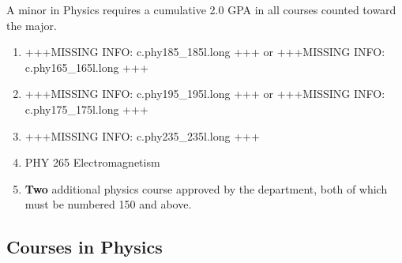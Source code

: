 \documentclass[
  letterpaper,
]{scrbook}
\begin{document}
A minor in Physics requires a cumulative 2.0 GPA in all courses counted
toward the major.

\begin{enumerate}
\def\labelenumi{\arabic{enumi}.}
\item
  +++MISSING INFO: c.phy185\_185l.long +++ or +++MISSING INFO:
  c.phy165\_165l.long +++
\item
  +++MISSING INFO: c.phy195\_195l.long +++ or +++MISSING INFO:
  c.phy175\_175l.long +++
\item
  +++MISSING INFO: c.phy235\_235l.long +++
\item
  PHY 265 Electromagnetism
\item
  \textbf{Two} additional physics course approved by the department,
  both of which must be numbered 150 and above.
\end{enumerate}

\subsection{Courses in Physics}\label{courses-in-physics}
\end{document}
